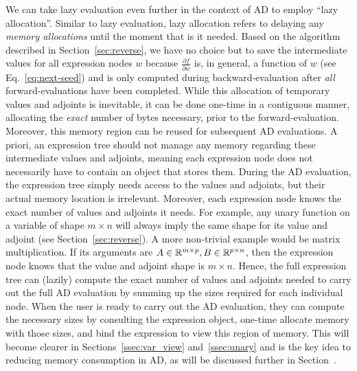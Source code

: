 We can take lazy evaluation even further in the context of AD to employ ``lazy allocation''.
Similar to lazy evaluation, lazy allocation refers to delaying any \emph{memory allocations} until the moment that is it needed.
Based on the algorithm described in Section~\ref{sec:reverse},
we have no choice but to save the intermediate values for all expression nodes $w$
because $\frac{\partial f}{\partial w}$ is, in general, a function of $w$ (see Eq.~\ref{eq:next-seed})
and is only computed during backward-evaluation after \emph{all} forward-evaluations have been completed.
While this allocation of temporary values and adjoints is inevitable,
it can be done one-time in a contiguous manner, allocating the \emph{exact} number of bytes necessary,
prior to the forward-evaluation.
Moreover, this memory region can be reused for subsequent AD evaluations.
A priori, an expression tree should not manage any memory regarding these intermediate values and adjoints,
meaning each expression node does not necessarily have to contain an object that stores them.
During the AD evaluation, the expression tree simply needs access to 
the values and adjoints, but their actual memory location is irrelevant.
Moreover, each expression node knows the exact number of values and adjoints it needs.
For example, any unary function on a variable of shape $m \times n$ 
will always imply the same shape for its value and adjoint (see Section~\ref{sec:reverse}).
A more non-trivial example would be matrix multiplication.
If its arguments are $A \in \mathbb{R}^{m \times p}, B \in \mathbb{R}^{p \times n}$, then
the expression node knows that the value and adjoint shape is $m \times n$.
Hence, the full expression tree can (lazily) compute the exact number of values and adjoints
needed to carry out the full AD evaluation by summing up the sizes required for each individual node.
When the user is ready to carry out the AD evaluation, 
they can compute the necessary sizes by consulting the expression object,
one-time allocate memory with those sizes, and
bind the expression to view this region of memory.
This will become clearer in Sections~\ref{ssec:var_view} and~\ref{ssec:unary}
and is the key idea to reducing memory consumption in AD, 
as will be discussed further in Section~.\@
